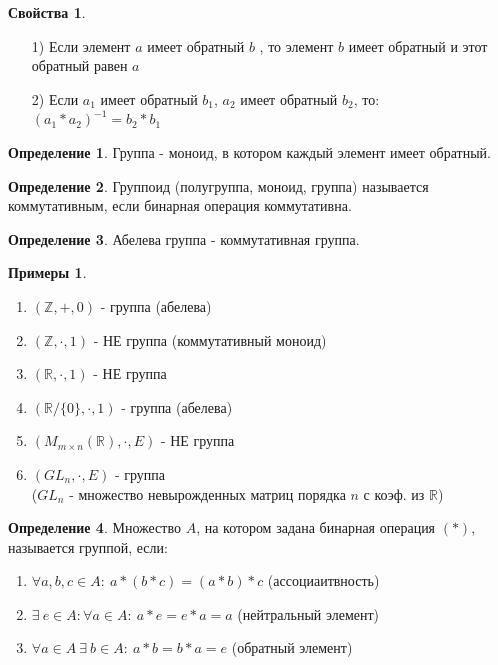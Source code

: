 \documentclass[a4paper, 12pt]{article}
\newcommand{\R}{\mathbb R}
\newcommand{\Z}{\mathbb Z}
\newcommand\tab[1][.5cm]{\hspace*{#1}}
\theoremstyle{definition}
\newtheorem*{definition}{Определение}
\newtheorem*{example}{Примеры}
\newtheorem*{properties}{Свойства}
\begin{document}
  \begin{properties}
    \begin{itemize} \tab
      \item[1)] Если элемент $a$  имеет обратный $b$ , то элемент $b$ имеет обратный и этот обратный равен $a$
      \item[2)] Если $a_1$ имеет обратный $b_1$, $a_2$ имеет обратный $b_2$, то: $(a_1*a_2)^{-1} = b_2*b_1$ 
    \end{itemize}
  \end{properties}
  \begin{definition}
    Группа - моноид, в котором каждый элемент имеет обратный.
  \end{definition}
  \begin{definition}
    Группоид (полугруппа, моноид, группа) называется коммутативным, если бинарная операция коммутативна.
  \end{definition} 
  \begin{definition}
    Абелева группа - коммутативная группа. 
  \end{definition}
  \begin{example}
    \begin{enumerate} \tab
      \item $(\Z, +, 0)$ - группа (абелева)
      \item $(\Z, \cdot, 1)$ - НЕ группа (коммутативный моноид)
      \item $(\R, \cdot, 1)$ - НЕ группа
      \item $(\R/\{0\}, \cdot, 1)$ - группа (абелева)
      \item $(M_{m \times n}(\R), \cdot, E)$ - НЕ группа
      \item $(GL_n, \cdot, E)$ - группа \\($GL_n$ - множество невырожденных матриц порядка $n$ с коэф. из $\R$)
    \end{enumerate}
  \end{example} 
  \begin{definition}
    Множество $A$, на котором задана бинарная операция $(*)$, называется группой, если:
    \begin{enumerate}
      \item  $\forall a,b,c \in A: \ a*(b*c)=(a*b)*c$ (ассоциаитвность)
      \item $\exists \ e \in A: \forall a \in A: \ a*e = e*a = a$ (нейтральный элемент)
      \item $\forall a \in A \ \exists \ b \in A: \ a*b = b*a = e $ (обратный элемент)
    \end{enumerate}
  \end{definition} 
\end{document}
